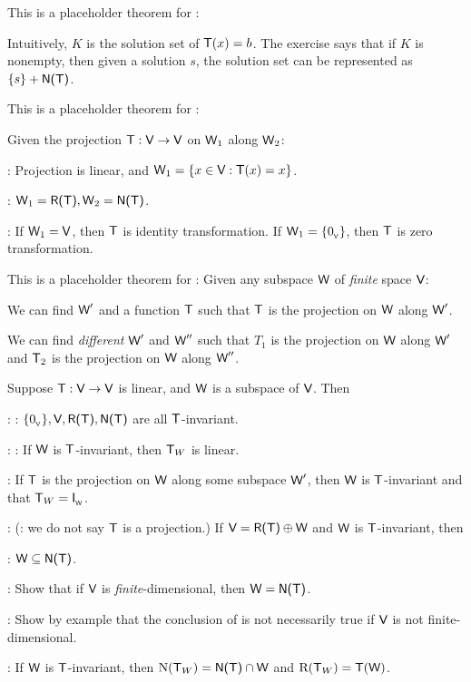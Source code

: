 \begin{additional theorem} \label{athm 2.6}
This is a placeholder theorem for :

Intuitively, \(K\) is the solution set of \(\textsf{T}(x) = b\).
The exercise says that if \(K\) is nonempty, then given a solution \(s\), the solution set can be represented as \(\{ s \} + \textsf{N(T)}\).
\end{additional theorem}

\begin{additional theorem} \label{athm 2.7}
This is a placeholder theorem for :

Given the projection \(\textsf{T} : \textsf{V} \to \textsf{V}\) on \(\textsf{W}_1\) along \(\textsf{W}_2\):

: Projection is linear, and \(\textsf{W}_1 = \{ x \in \textsf{V}: \textsf{T}(x) = x \}\).

: \(\textsf{W}_1 = \textsf{R(T)}, \textsf{W}_2 = \textsf{N(T)}\).

: If \(\textsf{W}_1 = \textsf{V}\), then \(\textsf{T}\) is identity transformation.
If \(\textsf{W}_1 = \{ 0_{_{\textsf{V}}} \}\), then \(\textsf{T}\) is zero transformation.
\end{additional theorem}

\begin{additional theorem} \label{athm 2.8}
This is a placeholder theorem for :
Given any subspace \(\textsf{W}\) of \emph{finite} space \(\textsf{V}\):

 We can find \(\textsf{W}'\) and a function \(\textsf{T}\) such that \(\textsf{T}\) is the projection on \(\textsf{W}\) along \(\textsf{W}'\).

 We can find \emph{different} \(\textsf{W}'\) and \(\textsf{W}''\) such that \(T_1\) is the projection on \(\textsf{W}\) along \(\textsf{W}'\) and \(\textsf{T}_2\) is the projection on \(\textsf{W}\) along \(\textsf{W}''\).
\end{additional theorem}

\begin{additional theorem} \label{athm 2.9}
Suppose \(\textsf{T} : \textsf{V} \to \textsf{V}\) is linear, and \(\textsf{W}\) is a subspace of \(\textsf{V}\).
Then

: : \(\{ 0_{_{\textsf{V}}} \}, \textsf{V}, \textsf{R(T)}, \textsf{N(T)}\) are all \(\textsf{T}\)-invariant.

: : If \(\textsf{W}\) is \(\textsf{T}\)-invariant, then \(\textsf{T}_W\) is linear.

 : If \(\textsf{T}\) is the projection on \(\textsf{W}\) along some subspace \(\textsf{W}'\), then \(\textsf{W}\) is \(\textsf{T}\)-invariant and that \(\textsf{T}_W = \textsf{I}_{_{\textsf{W}}}\).

: (: we do not say \(\textsf{T}\) is a projection.)
If \(\textsf{V} = \textsf{R(T)} \oplus \textsf{W}\) and \(\textsf{W}\) is \(\textsf{T}\)-invariant, then

: \(\textsf{W} \subseteq \textsf{N(T)}\).

: Show that if \(\textsf{V}\) is \emph{finite}-dimensional, then \(\textsf{W} = \textsf{N(T)}\).

: Show by example that the conclusion of  is not necessarily true if \(\textsf{V}\) is not finite-dimensional.


:
If \(\textsf{W}\) is \(\textsf{T}\)-invariant, then \(\mathrm{N}(\textsf{T}_W) = \textsf{N(T)} \cap \textsf{W}\) and \(\mathrm{R}(\textsf{T}_W) = \textsf{T}(\textsf{W})\).
\end{additional theorem}

